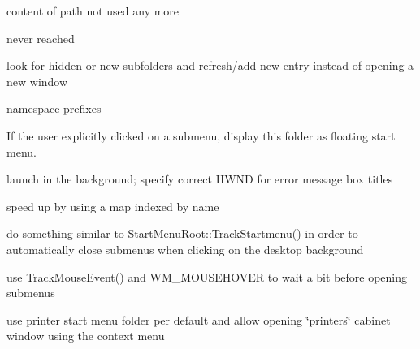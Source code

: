 \begin{DoxyRefList}
content of \textquotesingle{}path\textquotesingle{} not used any more  
\item[\label{todo__todo000044}%
\Hypertarget{todo__todo000044}%
成员 \hyperlink{struct_shell_browser_a575ee8758d47796428a80c8ac2a66c49}{Shell\+Browser\+:\+:Message\+S\+F\+V\+CB} (U\+I\+NT u\+Msg, W\+P\+A\+R\+AM w\+Param, L\+P\+A\+R\+AM l\+Param)]never reached  
\item[\label{todo__todo000045}%
\Hypertarget{todo__todo000045}%
成员 \hyperlink{struct_shell_browser_a018b43673fbbf31294499cff061b61f3}{Shell\+Browser\+:\+:On\+Default\+Command} (L\+P\+I\+DA pida)]look for hidden or new subfolders and refresh/add new entry instead of opening a new window  
\item[\label{todo__todo000046}%
\Hypertarget{todo__todo000046}%
成员 \hyperlink{struct_shell_browser_ab8cc56ea36be84287a8e7d7d1ee0f7d5}{Shell\+Browser\+:\+:refresh} ()]
\item[\label{todo__todo000098}%
\Hypertarget{todo__todo000098}%
文件 \hyperlink{snmp__structs_8h}{snmp\+\_\+structs.h} ]namespace prefixes  
\item[\label{todo__todo000064}%
\Hypertarget{todo__todo000064}%
成员 \hyperlink{struct_start_menu_ac72c647cac3307a5f0b80e19ed5c155a}{Start\+Menu\+:\+:Activate\+Entry} (int id, const Shell\+Entry\+Set \&entries)]If the user explicitly clicked on a submenu, display this folder as floating start menu. 

launch in the background; specify correct H\+W\+ND for error message box titles  
\item[\label{todo__todo000063}%
\Hypertarget{todo__todo000063}%
成员 \hyperlink{struct_start_menu_a3649f39dcdb77983e7f3e4de8bc9d1bf}{Start\+Menu\+:\+:Add\+Entry} (const String \&title, I\+C\+O\+N\+\_\+\+ID icon\+\_\+id, \hyperlink{struct_entry}{Entry} $\ast$entry)]speed up by using a map indexed by name  
\item[\label{todo__todo000061}%
\Hypertarget{todo__todo000061}%
成员 \hyperlink{struct_start_menu_a12aaba6be3ac789748b012dffac0cacd}{Start\+Menu\+:\+:Wnd\+Proc} (U\+I\+NT nmsg, W\+P\+A\+R\+AM wparam, L\+P\+A\+R\+AM lparam)]do something similar to Start\+Menu\+Root\+::\+Track\+Startmenu() in order to automatically close submenus when clicking on the desktop background 

use Track\+Mouse\+Event() and W\+M\+\_\+\+M\+O\+U\+S\+E\+H\+O\+V\+ER to wait a bit before opening submenus  
\item[\label{todo__todo000066}%
\Hypertarget{todo__todo000066}%
成员 \hyperlink{struct_start_menu_handler_acf21227ba5f3d16659873efd2630a200}{Start\+Menu\+Handler\+:\+:Command} (int id, int code)]use printer start menu folder per default and allow opening \char`\"{}printers\char`\"{} cabinet window using the context menu 


\end{DoxyRefList}

